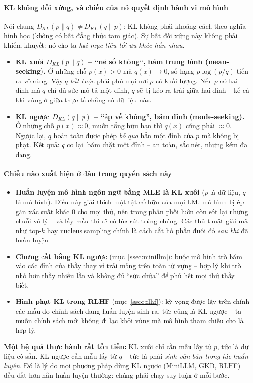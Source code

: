 \paragraph{KL không đối xứng, và chiều của nó quyết định hành vi mô hình}
Nói chung $D_{KL}(p\|q) \neq D_{KL}(q\|p)$: KL không phải khoảng cách theo nghĩa hình học (không có bất đẳng thức tam giác). Sự bất đối xứng này không phải khiếm khuyết: nó cho ta \emph{hai mục tiêu tối ưu khác hẳn nhau}.
\begin{itemize}
    \item \textbf{KL xuôi $D_{KL}(p\|q)$ -- “né số không”, bám trung bình (mean-seeking).} Ở những chỗ $p(x) > 0$ mà $q(x) \to 0$, số hạng $p \log(p/q)$ tiến ra vô cùng. Vậy $q$ \emph{bắt buộc} phải phủ mọi nơi $p$ có khối lượng. Nếu $p$ có hai đỉnh mà $q$ chỉ đủ sức mô tả một đỉnh, $q$ sẽ bị kéo ra trải giữa hai đỉnh -- kể cả khi vùng ở giữa thực tế chẳng có dữ liệu nào.
    \item \textbf{KL ngược $D_{KL}(q\|p)$ -- “ép về không”, bám đỉnh (mode-seeking).} Ở những chỗ $p(x) \approx 0$, muốn tổng hữu hạn thì $q(x)$ cũng phải $\approx 0$. Ngược lại, $q$ hoàn toàn được phép \emph{bỏ qua} hẳn một đỉnh của $p$ mà không bị phạt. Kết quả: $q$ co lại, bám chặt một đỉnh -- an toàn, sắc nét, nhưng kém đa dạng.
\end{itemize}

\paragraph{Chiều nào xuất hiện ở đâu trong quyển sách này}
\begin{itemize}
    \item \textbf{Huấn luyện mô hình ngôn ngữ bằng MLE là KL xuôi} ($p$ là dữ liệu, $q$ là mô hình). Điều này giải thích một tật cố hữu của mọi LM: mô hình bị ép gán xác suất khác $0$ cho mọi thứ, nên trong phân phối luôn còn sót lại những chuỗi vô lý -- và lấy mẫu thì sẽ có lúc rút trúng chúng. Các thủ thuật giải mã như top-$k$ hay nucleus sampling chính là cách cắt bỏ phần đuôi đó \emph{sau khi} đã huấn luyện.
    \item \textbf{Chưng cất bằng KL ngược} (mục~\ref{ssec:minillm}): buộc mô hình trò bám vào các đỉnh của thầy thay vì trải mỏng trên toàn từ vựng -- hợp lý khi trò nhỏ hơn thầy nhiều lần và không đủ “sức chứa” để phủ hết mọi thứ thầy biết.
    \item \textbf{Hình phạt KL trong RLHF} (mục~\ref{ssec:rlhf}): kỳ vọng được lấy trên chính các mẫu do chính sách đang huấn luyện sinh ra, tức cũng là KL ngược -- ta muốn chính sách mới không đi lạc khỏi vùng mà mô hình tham chiếu cho là hợp lý.
\end{itemize}
\noindent \textbf{Một hệ quả thực hành rất tốn tiền:} KL xuôi chỉ cần mẫu lấy từ $p$, tức là dữ liệu có sẵn. KL ngược cần mẫu lấy từ $q$ -- tức là phải \emph{sinh văn bản trong lúc huấn luyện}. Đó là lý do mọi phương pháp dùng KL ngược (MiniLLM, GKD, RLHF) đều đắt hơn hẳn huấn luyện thường: chúng phải chạy suy luận ở mỗi bước.

